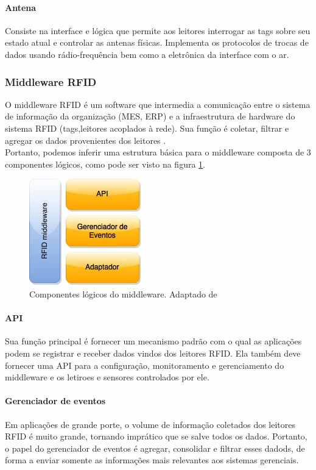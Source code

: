 	\paragraph{Antena} Consiste na interface e lógica que permite aos leitores interrogar as tags sobre seu estado atual e controlar as antenas físicas. Implementa os protocolos de trocas de dados usando rádio-frequência bem como a eletrônica da interface com o ar.

	
	\subsubsection{Middleware RFID}
	
	O middleware RFID é um software que intermedia a comunicação entre o sistema de informação da organização (MES, ERP) e a infraestrutura de hardware do sistema RFID (tags,leitores acoplados à rede). Sua função é coletar, filtrar e agregar os dados provenientes dos leitores \cite{renatarfid}. \\
	Portanto, podemos inferir uma estrutura básica para o middleware composta de 3 componentes lógicos, como pode ser visto na figura \ref{fig:middleware}.
		
		\begin{figure}[h!]
			\centering
			\includegraphics[width=0.25\linewidth]{middleware}
			\caption{Componentes lógicos do middleware. Adaptado de \cite{rfidbook}}
			\label{fig:middleware}
		\end{figure}
	
	\paragraph{API} Sua função principal é fornecer um mecanismo padrão com o qual as aplicações podem se registrar e receber dados vindos dos leitores RFID. Ela também deve fornecer uma API para a configuração, monitoramento e gerenciamento do middleware e os letiroes e sensores controlados por ele.
	\paragraph{Gerenciador de eventos} Em aplicações de grande porte, o volume de informação coletados dos leitores RFID é muito grande, tornando imprático que se salve todos os dados. Portanto, o papel do gerenciador de eventos é agregar, consolidar e filtrar esses dadods, de forma a enviar somente as informações mais relevantes aos sistemas gerenciais.
